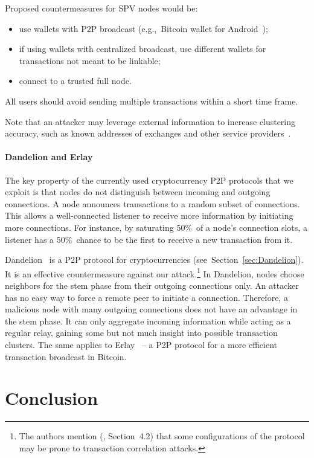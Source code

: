 Proposed countermeasures for SPV nodes would be:

\begin{itemize}
	\item use wallets with P2P broadcast (e.g.,~Bitcoin wallet for Android~\cite{BitcoinWallet});
	\item if using wallets with centralized broadcast, use different wallets for transactions not meant to be linkable;
	\item connect to a trusted full node.
\end{itemize}

All users should avoid sending multiple transactions within a short time frame.

Note that an attacker may leverage external information to increase clustering accuracy, such as known addresses of exchanges and other service providers~\cite{Walletexplorer}.

\paragraph{Dandelion and Erlay}

The key property of the currently used cryptocurrency P2P protocols that we exploit is that nodes do not distinguish between incoming and outgoing connections.
A node announces transactions to a random subset of connections.
This allows a well-connected listener to receive more information by initiating more connections.
For instance, by saturating $50\%$~of a node's connection slots, a listener has a $50\%$~chance to be the first to receive a new transaction from it.

Dandelion~\cite{Fanti2018} is a P2P protocol for cryptocurrencies (see~Section~\ref{sec:Dandelion}).
It is an effective countermeasure against our attack.\footnote{The authors mention (\cite{Fanti2018}, Section~4.2) that some configurations of the protocol may be prone to transaction correlation attacks.}
In Dandelion, nodes choose neighbors for the stem phase from their outgoing connections only.
An attacker has no easy way to force a remote peer to initiate a connection.
Therefore, a malicious node with many outgoing connections does not have an advantage in the stem phase.
It can only aggregate incoming information while acting as a regular relay, gaining some but not much insight into possible transaction clusters.
The same applies to Erlay~\cite{Naumenko2019} -- a P2P protocol for a more efficient transaction broadcast in Bitcoin.


\section{Conclusion} \label{sec:Ch03Conclusion}

